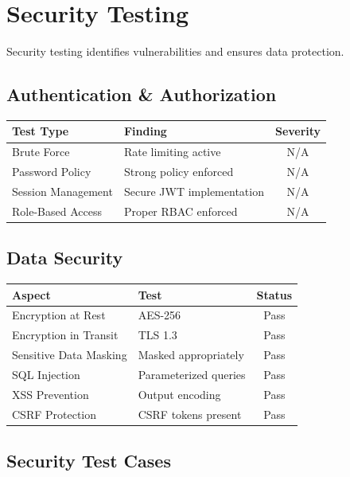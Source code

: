 \documentclass[12pt,a4paper]{report}
\begin{document}
\section{Security Testing}
Security testing identifies vulnerabilities and ensures data protection.

\subsection{Authentication \& Authorization}

\begin{longtable}{|p{3cm}|p{3cm}|c|}
\hline
\textbf{Test Type} & \textbf{Finding} & \textbf{Severity} \\
\hline
\endfirsthead
Brute Force & Rate limiting active & N/A \\
\hline
Password Policy & Strong policy enforced & N/A \\
\hline
Session Management & Secure JWT implementation & N/A \\
\hline
Role-Based Access & Proper RBAC enforced & N/A \\
\hline
\end{longtable}

\subsection{Data Security}

\begin{longtable}{|p{3.5cm}|p{4cm}|c|}
\hline
\textbf{Aspect} & \textbf{Test} & \textbf{Status} \\
\hline
\endfirsthead
Encryption at Rest & AES-256 & Pass \\
\hline
Encryption in Transit & TLS 1.3 & Pass \\
\hline
Sensitive Data Masking & Masked appropriately & Pass \\
\hline
SQL Injection & Parameterized queries & Pass \\
\hline
XSS Prevention & Output encoding & Pass \\
\hline
CSRF Protection & CSRF tokens present & Pass \\
\hline
\end{longtable}

\subsection{Security Test Cases}
\end{document}
